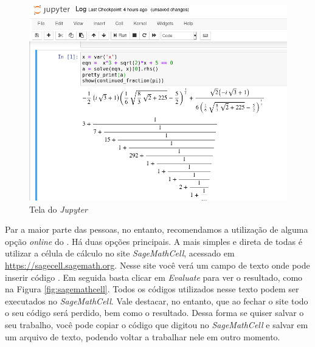 \begin{figure}[h]
  \centering
  \includegraphics[scale=0.4]{imgs/jupyter.png}
  \caption{Tela do \emph{Jupyter}}
  \label{fig:jupyter}
\end{figure}

Par a maior parte das pessoas, no entanto, recomendamos
a utilização de alguma opção \emph{online} do \sage. Há duas
opções principais. A mais simples e direta de todas é utilizar
a célula de cálculo no site \emph{SageMathCell}, 
acessado em \url{https://sagecell.sagemath.org}. Nesse site
você verá um campo de texto onde pode inserir código \sage. Em
seguida basta clicar em \emph{Evaluate} para ver o resultado,
como na Figura \ref{fig:sagemathcell}.  Todos os códigos
utilizados nesse texto podem ser executados no
\emph{SageMathCell}. Vale destacar, no entanto, que ao fechar o site
todo o seu código será perdido, bem como o resultado. Dessa forma
se quiser salvar o seu trabalho, você pode copiar o código que digitou
no \emph{SageMathCell} e salvar em um arquivo de texto, podendo
voltar a trabalhar nele em outro momento.

